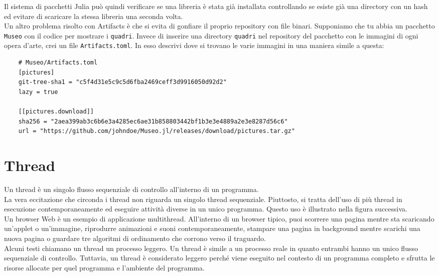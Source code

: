 \documentclass[a4paper]{extreport}
\begin{document}
\begin{multicols*}{2}
Il sistema di pacchetti Julia può quindi verificare se una libreria è stata già installata controllando se esiste già una directory con un hash ed evitare di scaricare la stessa libreria una seconda volta.
\\Un altro problema risolto con Artifacts è che si evita di gonfiare il proprio repository con file binari. Supponiamo che tu abbia un pacchetto \verb|Museo| con il codice per mostrare i \verb|quadri|. Invece di inserire una directory \verb|quadri| nel repository del pacchetto con le immagini di ogni opera d'arte, crei un file \verb|Artifacts.toml|. In esso descrivi dove si trovano le varie immagini in una maniera simile a questa:
{\small\begin{verbatim}
    # Museo/Artifacts.toml 
    [pictures]
    git-tree-sha1 = "c5f4d31e5c9c5d6fba2469ceff3d9916050d92d2"
    lazy = true

    [[pictures.download]]
    sha256 = "2aea399ab3c6b6e3a4285ec6ae31b858803442bf1b3e3e4889a2e3e8287d56c6"
    url = "https://github.com/johndoe/Museo.jl/releases/download/pictures.tar.gz"
\end{verbatim}}
\section{Thread}
Un thread è un singolo flusso sequenziale di controllo all'interno di un programma.~\cite{threads}\\
La vera eccitazione che circonda i thread non riguarda un singolo thread sequenziale. Piuttosto, si tratta dell'uso di più thread in esecuzione contemporaneamente ed eseguire attività diverse in un unico programma. Questo uso è illustrato nella figura successiva.
\\Un browser Web è un esempio di applicazione multithread. All'interno di un browser tipico, puoi scorrere una pagina mentre sta scaricando un'applet o un'immagine, riprodurre animazioni e suoni contemporaneamente, stampare una pagina in background mentre scarichi una nuova pagina o guardare tre algoritmi di ordinamento che corrono verso il traguardo.
\\Alcuni testi chiamano un thread un processo leggero. Un thread è simile a un processo reale in quanto entrambi hanno un unico flusso sequenziale di controllo. Tuttavia, un thread è considerato leggero perché viene eseguito nel contesto di un programma completo e sfrutta le risorse allocate per quel programma e l'ambiente del programma.
\\\\\\\\\\\\\\\\\\\\\\\\\

\end{multicols*}
\end{document}
